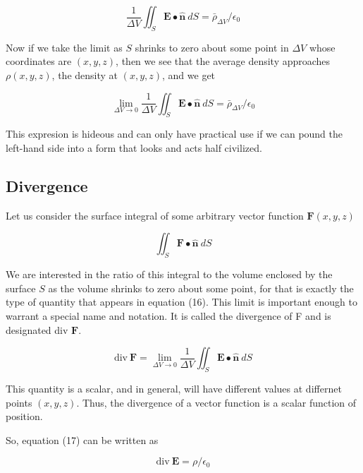 \documentclass[11pt]{article}
\begin{document}
\begin{equation}
	\frac{1}{\Delta V} \iint_S \mathbf{E} \bullet \mathbf{\hat{n}} \: dS = \bar{\rho}_{\Delta V}/ \epsilon_0
\end{equation}

Now if we take the limit as $S$ shrinks to zero about some point in $\Delta V$ whose coordinates are $(x,y,z)$, then we see that the average density approaches $\rho(x,y,z)$, the density at $(x,y,z)$, and we get

\begin{equation}
	\lim_{\Delta V \rightarrow 0} \frac{1}{\Delta V} \iint_S \mathbf{E} \bullet \mathbf{\hat{n}} \: dS = \bar{\rho}_{\Delta V}/ \epsilon_0
\end{equation}

This expresion is hideous and can only have practical use if we can pound the left-hand side into a form that looks and acts half civilized.

\subsection{Divergence}

Let us consider the surface integral of some arbitrary vector function $\mathbf{F}(x,y,z)$

\begin{equation}
	\iint_S \mathbf{F} \bullet \mathbf{\hat{n}} \: dS
\end{equation}

We are interested in the ratio of this integral to the volume enclosed by the surface $S$ as the volume shrinks to zero about some point, for that is exactly the type of quantity that appears in equation (16). This limit is important enough to warrant a special name and notation. It is called the divergence of F and is designated div $\mathbf{F}$.

\begin{equation}
	\text{div} \: \mathbf{F} = \lim_{\Delta V \rightarrow 0} \frac{1}{\Delta V} \iint_S \mathbf{E} \bullet \mathbf{\hat{n}} \: dS
\end{equation}

This quantity is a scalar, and in general, will have different values at differnet points $(x,y,z)$.
Thus, the divergence of a vector function is a scalar function of position.

So, equation (17) can be written as

\begin{equation}
	\text{div} \: \mathbf{E} = \rho/\epsilon_0
\end{equation}
\end{document}
